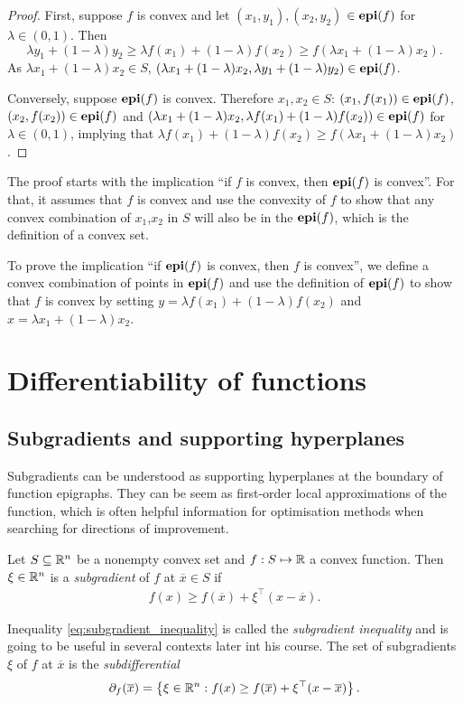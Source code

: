 %
\begin{proof}
	First, suppose $f$ is convex and let $(x_1, y_1), (x_2, y_2)$ $\in \mathop{\bf epi}(f)$ for $\lambda \in (0,1)$. Then
\begin{equation*}
	\lambda y_1 + (1-\lambda)y_2 \geq \lambda f(x_1) + (1-\lambda)f(x_2) \geq f(\lambda x_1 + (1- \lambda)x_2).
\end{equation*}
As $\lambda x_1 + (1-\lambda)x_2 \in S$, $(\lambda x_1 + (1-\lambda)x_2,\lambda y_1 + (1-\lambda)y_2) \in \mathop{\bf epi}(f)$.

Conversely, suppose $\mathop{\bf epi}(f)$ is convex. Therefore $x_1, x_2 \in S$: $(x_1,f(x_1))\in \mathop{\bf epi}(f)$, $(x_2,f(x_2)) \in \mathop{\bf epi}(f)$ and $(\lambda x_1 + (1-\lambda)x_2, \lambda f(x_1) + (1-\lambda)f(x_2)) \in \mathop{\bf epi}(f)$ for $\lambda \in (0,1)$, implying that $\lambda f(x_1) + (1-\lambda)f(x_2) \geq f(\lambda x_1 + (1-\lambda)x_2)$.
\end{proof}

The proof starts with the implication ``if $f$ is convex, then $\mathop{\bf epi}(f)$ is convex''. For that, it assumes that $f$ is convex and use the convexity of $f$ to show that any convex combination of $x_1$,$x_2$ in $S$ will also be in the $\mathop{\bf epi}(f)$, which is the definition of a convex set.

To prove the implication ``if $\mathop{\bf epi}(f)$ is convex, then $f$ is convex'', we define a convex combination of points in $\mathop{\bf epi}(f)$ and use the definition of $\mathop{\bf epi}(f)$ to show that $f$ is convex by setting $y = \lambda f(x_1) + (1 - \lambda)f(x_2)$ and $x = \lambda x_1 + (1-\lambda)x_2$.


\section{Differentiability of functions}


\subsection{Subgradients and supporting hyperplanes}


Subgradients can be understood as supporting hyperplanes at the boundary of function epigraphs. They can be seem as first-order local approximations of the function, which is often helpful information for optimisation methods when searching for directions of improvement.
%
\begin{definition}[Subgradients]
	Let $S \subseteq \mathbb{R}^n$ be a nonempty convex set and $f:S \mapsto \mathbb{R}$ a convex function. Then $\xi\in \mathbb{R}^n$ is a \emph{subgradient} of $f$ at $\overline{x} \in S$ if
	\begin{align} 
	f(x) \geq f(\overline{x}) + \xi^\top(x - \overline{x}). \label{eq:subgradient_inequality}
	\end{align}
\end{definition}
%
Inequality \eqref{eq:subgradient_inequality} is called the \emph{subgradient inequality} and is going to be useful in several contexts later int his course. The set of subgradients $\xi$ of $f$ at $\overline{x}$ is the \emph{subdifferential} 
	$$
	\partial_f(\overline{x}) = \left\{ \xi \in \mathbb{R}^n : f(x) \geq f(\overline{x}) + \xi^\top(x - \overline{x}) \right \}.
	$$ 

